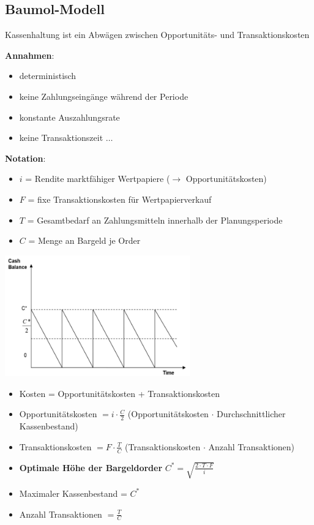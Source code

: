 \subsection{Baumol-Modell} 
Kassenhaltung ist ein Abwägen zwischen Opportunitäts- und Transaktionskosten

\textbf{Annahmen}:
\begin{itemize}
	\item deterministisch
	\item keine Zahlungseingänge während der Periode
	\item konstante Auszahlungsrate
	\item keine Transaktionszeit $\ldots$
\end{itemize}

\textbf{Notation}:
\begin{itemize}
	\item $i$ = Rendite marktfähiger Wertpapiere ($\rightarrow$ Opportunitätskosten)
	\item $F$ = fixe Transaktionskosten für Wertpapierverkauf
	\item $T$ = Gesamtbedarf an Zahlungsmitteln innerhalb der
	Planungsperiode
	\item $C$ = Menge an Bargeld je Order
\end{itemize}
\begin{center}
	\includegraphics[width=0.6\textwidth]{images/e4.png}
\end{center}
\begin{itemize}
	\item Kosten = Opportunitätskosten + Transaktionskosten
	\item Opportunitätskosten $=i\cdot\frac{C}{2}$ (Opportunitätskosten $\cdot$ Durchschnittlicher Kassenbestand)
	\item Transaktionskosten $=F\cdot\frac{T}{C}$ (Transaktionskosten $\cdot$ Anzahl Transaktionen)
	\item \textbf{Optimale Höhe der Bargeldorder} $C^*=\sqrt{\frac{2\cdot T\cdot F}{i}}$
	\item Maximaler Kassenbestand = $C^*$
	\item Anzahl Transaktionen $=\frac{T}{C}$
\end{itemize}